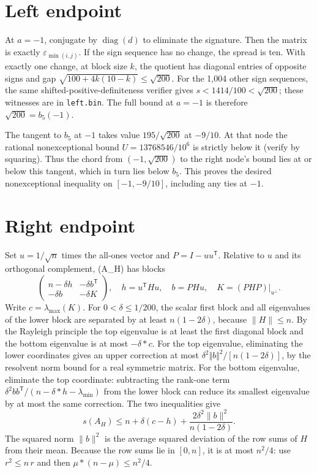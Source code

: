 \documentclass[11pt]{article}
\begin{document}
\section{Left endpoint}\label{left-endpoint}

At \(a=-1\), conjugate by \(\operatorname{diag}(d)\) to eliminate the signature. Then the matrix is exactly \(\varepsilon_{\min(i,j)}\). If the sign sequence has no change, the spread is ten. With exactly one change, at block size \(k\), the quotient has diagonal entries of opposite signs and gap \(\sqrt{100+4k(10-k)}\le \sqrt{200}\). For the 1,004 other sign sequences, the same shifted-positive-definiteness verifier gives \(s<1414/100<\sqrt{200}\); these witnesses are in \texttt{left.bin}. The full bound at \(a=-1\) is therefore \(\sqrt{200}=b_5(-1)\).

The tangent to \(b_5\) at \(-1\) takes value \(195/\sqrt{200}\) at \(-9/10\). At that node the rational nonexceptional bound \(U=13768546/10^6\) is strictly below it (verify by squaring). Thus the chord from \((-1,\sqrt{200})\) to the right node's bound lies at or below this tangent, which in turn lies below \(b_5\). This proves the desired nonexceptional inequality on \([-1,-9/10]\), including any ties at \(-1\).

\section{Right endpoint}\label{right-endpoint}

Set \(u=1/\sqrt{n}\) times the all-ones vector and \(P=I-uu^{\mathsf T}\). Relative to \(u\) and its orthogonal complement, (A\_H) has blocks
\[
\begin{pmatrix}n-\delta h&-\delta b^{\mathsf T}\\-\delta b&-\delta K\end{pmatrix},\quad h=u^{\mathsf T}Hu,\quad b=PHu,\quad K=(PHP)|_{u^\perp}.
\]
Write \(c=\lambda_{\max}(K)\). For \(0<\delta \le 1/200\), the scalar first block and all eigenvalues of the lower block are separated by at least \(n(1-2\delta )\), because \(\lVert H\rVert\le n\). By the Rayleigh principle the top eigenvalue is at least the first diagonal block and the bottom eigenvalue is at most \(-\delta *c\). For the top eigenvalue, eliminating the lower coordinates gives an upper correction at most \(\delta ^2\Vert b\Vert ^2/[n(1-2\delta )]\), by the resolvent norm bound for a real symmetric matrix. For the bottom eigenvalue, eliminate the top coordinate: subtracting the rank-one term \(\delta ^2 bb^{\mathsf T}/(n-\delta *h-\lambda_{\min})\) from the lower block can reduce its smallest eigenvalue by at most the same correction. The two inequalities give
\[
s(A_H)\le n+\delta(c-h)+\frac{2\delta^2\lVert b\rVert^2}{n(1-2\delta)}.
\]
The squared norm \(\lVert b\rVert^2\) is the average squared deviation of the row sums of \(H\) from their mean. Because the row sums lie in \([0,n]\), it is at most \(n^2/4\): use \(r^2\le n\,r\) and then \(\mu *(n-\mu )\le n^2/4\).
\end{document}
